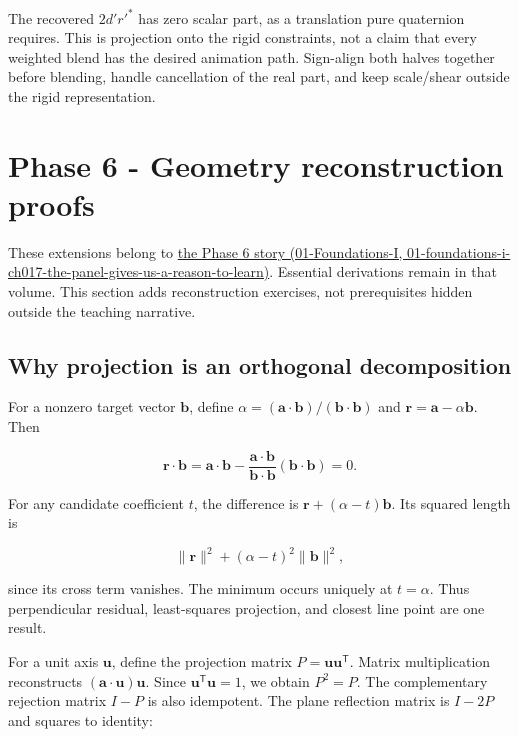 The recovered \(2d'r'^*\) has zero scalar part, as a translation pure quaternion requires. This is projection onto the rigid constraints, not a claim that every weighted blend has the desired animation path. Sign-align both halves together before blending, handle cancellation of the real part, and keep scale/shear outside the rigid representation.

\section{Phase 6 - Geometry reconstruction proofs}\label{02-foundations-ii-ch039-phase-6---geometry-reconstruction-proofs}

These extensions belong to \href{../01-Foundations-I/main.pdf\#nameddest=01-foundations-i-ch017-the-panel-gives-us-a-reason-to-learn}{the Phase 6 story (01-Foundations-I, 01-foundations-i-ch017-the-panel-gives-us-a-reason-to-learn)}. Essential derivations remain in that volume. This section adds reconstruction exercises, not prerequisites hidden outside the teaching narrative.

\subsection{Why projection is an orthogonal decomposition}\label{02-foundations-ii-ch039-why-projection-is-an-orthogonal-decomposition}

For a nonzero target vector \(\mathbf b\), define \(\alpha=(\mathbf a\cdot\mathbf b)/(\mathbf b\cdot\mathbf b)\) and \(\mathbf r=\mathbf a-\alpha\mathbf b\). Then

\[
\mathbf r\cdot\mathbf b=\mathbf a\cdot\mathbf b-
\frac{\mathbf a\cdot\mathbf b}{\mathbf b\cdot\mathbf b}(\mathbf b\cdot\mathbf b)=0.
\]

For any candidate coefficient \(t\), the difference is \(\mathbf r+(\alpha-t)\mathbf b\). Its squared length is

\[
\|\mathbf r\|^2+(\alpha-t)^2\|\mathbf b\|^2,
\]

since its cross term vanishes. The minimum occurs uniquely at \(t=\alpha\). Thus perpendicular residual, least-squares projection, and closest line point are one result.

For a unit axis \(\mathbf u\), define the projection matrix \(P=\mathbf u\mathbf u^\mathsf T\). Matrix multiplication reconstructs \((\mathbf a\cdot\mathbf u)\mathbf u\). Since \(\mathbf u^\mathsf T\mathbf u=1\), we obtain \(P^2=P\). The complementary rejection matrix \(I-P\) is also idempotent. The plane reflection matrix is \(I-2P\) and squares to identity:


